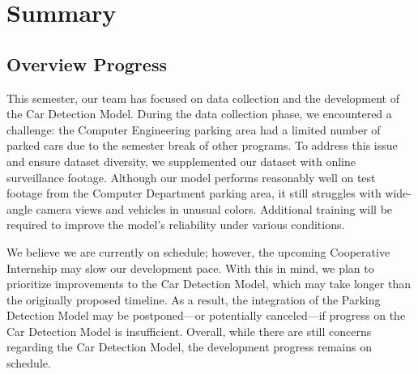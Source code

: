 \chapter{Summary}
\label{chap:summary}

\section{Overview Progress}
\label{section:overview-progress}
This semester, our team has focused on data collection and the development of the Car Detection Model. During the data collection phase, we encountered a challenge: the Computer Engineering parking area had a limited number of parked cars due to the semester break of other programs. To address this issue and ensure dataset diversity, we supplemented our dataset with online surveillance footage. Although our model performs reasonably well on test footage from the Computer Department parking area, it still struggles with wide-angle camera views and vehicles in unusual colors. Additional training will be required to improve the model’s reliability under various conditions.

We believe we are currently on schedule; however, the upcoming Cooperative Internship may slow our development pace. With this in mind, we plan to prioritize improvements to the Car Detection Model, which may take longer than the originally proposed timeline. As a result, the integration of the Parking Detection Model may be postponed—or potentially canceled—if progress on the Car Detection Model is insufficient. Overall, while there are still concerns regarding the Car Detection Model, the development progress remains on schedule.